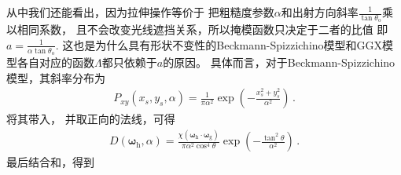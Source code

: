 从中我们还能看出，因为拉伸操作等价于
把粗糙度参数$\alpha$和出射方向斜率$\displaystyle\frac{1}{\tan\theta_{\mathrm{o}}}$乘以相同系数，
且不会改变光线遮挡关系，所以掩模函数只决定于二者的比值
即$\displaystyle a=\frac{1}{\alpha\tan\theta_{\mathrm{o}}}$.
这也是为什么具有形状不变性的Beckmann-Spizzichino模型和GGX模型各自对应的函数$\Lambda$都只依赖于$a$的原因。
具体而言，对于Beckmann-Spizzichino模型，其斜率分布为
\begin{align}
    P_{xy}(x_s,y_s,\alpha)=\frac{1}{\pi\alpha^2}\exp\left(-\frac{x_s^2+y_s^2}{\alpha^2}\right)\, .
\end{align}
将其带入，
并取正向的法线，可得
\begin{align}
    D({\bm\omega}_{\mathrm{h}},\alpha)=\frac{\chi({\bm\omega}_{\mathrm{h}}\cdot{\bm\omega}_{\mathrm{g}})}
    {\pi\alpha^2\cos^4\theta}\exp\left(-\frac{\tan^2\theta}{\alpha^2}\right)\, .
\end{align}
最后结合和，得到
